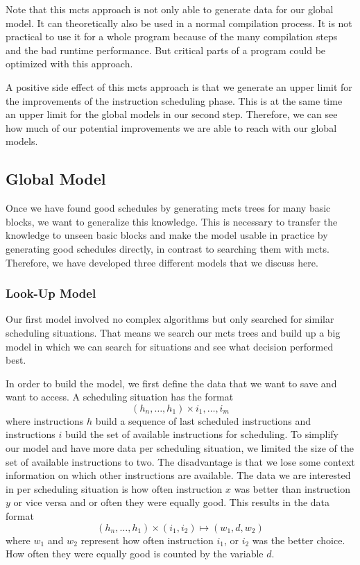 Note that this \ac{mcts} approach is not only able to generate data for our global model.
It can theoretically also be used in a normal compilation process.
It is not practical to use it for a whole program because of the many compilation steps and the bad runtime performance.
But critical parts of a program could be optimized with this approach.

A positive side effect of this \ac{mcts} approach is that we generate an upper limit for the improvements of the instruction scheduling phase.
This is at the same time an upper limit for the global models in our second step.
Therefore, we can see how much of our potential improvements we are able to reach with our global models.

\subsection{Global Model}
\label{subsec:approach:ml:global}
Once we have found good schedules by generating \ac{mcts} trees for many basic blocks, we want to generalize this knowledge.
This is necessary to transfer the knowledge to unseen basic blocks and make the model usable in practice by generating good schedules directly, in contrast to searching them with \ac{mcts}.
Therefore, we have developed three different models that we discuss here.

\subsubsection{Look-Up Model}
Our first model involved no complex algorithms but only searched for similar scheduling situations.
That means we search our \ac{mcts} trees and build up a big model in which we can search for situations and see what decision performed best.

In order to build the model, we first define the data that we want to save and want to access.
A scheduling situation has the format
\begin{equation}
    (h_n, \ldots, h_1) \times {i_1, \ldots, i_m}
    \label{eqn:approach:example-scheduling-situation}
\end{equation}
where instructions $h$ build a sequence of last scheduled instructions and instructions $i$ build the set of available instructions for scheduling.
To simplify our model and have more data per scheduling situation, we limited the size of the set of available instructions to two.
The disadvantage is that we lose some context information on which other instructions are available.
The data we are interested in per scheduling situation is how often instruction $x$ was better than instruction $y$ or vice versa and or often they were equally good.
This results in the data format
\begin{equation}
    (h_n, \ldots, h_1) \times (i_1, i_2) \mapsto (w_1, d, w_2)
\end{equation}
where $w_1$ and $w_2$ represent how often instruction $i_1$, or $i_2$ was the better choice.
How often they were equally good is counted by the variable $d$.

